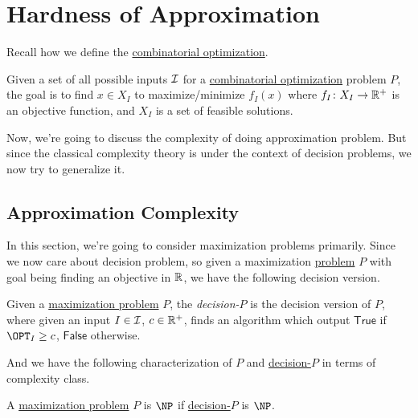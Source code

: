 \chapter{Hardness of Approximation}
Recall how we define the \hyperref[def:combinatorial-optimization]{combinatorial optimization}.

\begin{prev}
	Given a set of all possible inputs \(\mathcal{\MakeUppercase{i}} \) for a \hyperref[def:combinatorial-optimization]{combinatorial optimization} problem \(P\), the goal is to find \(x\in X_I\) to maximize/minimize \(f_I (x)\) where \(f_I \colon X_I \to \mathbb{\MakeUppercase{r}} ^+\) is an objective function, and \(X_I\) is a set of feasible solutions.
\end{prev}

Now, we're going to discuss the complexity of doing approximation problem. But since the classical complexity theory is under the context of decision problems, we now try to generalize it.

\section{Approximation Complexity}
In this section, we're going to consider maximization problems primarily. Since we now care about decision problem, so given a maximization \hyperref[def:combinatorial-optimization]{problem} \(P\) with goal being finding an objective in \(\mathbb{\MakeUppercase{r}} \), we have the following decision version.

\begin{definition}[Decision-\(P\)]\label{def:decision-P}
	Given a \hyperref[def:combinatorial-optimization]{maximization problem} \(P\), the \emph{decision-\(P\)} is the decision version of \(P\), where given an input \(I\in \mathcal{\MakeUppercase{i}} \), \(c\in \mathbb{\MakeUppercase{r}} ^+\), finds an algorithm which output \(\textsf{True}\) if \(\OPT_I \geq c\), \(\textsf{False}\) otherwise.
\end{definition}

And we have the following characterization of \(P\) and \hyperref[def:decision-P]{decision-\(P\)} in terms of complexity class.

\begin{definition}
	A \hyperref[def:combinatorial-optimization]{maximization problem} \(P\) is \(\NP\) if \hyperref[def:decision-P]{decision-\(P\)} is \(\NP\).
\end{definition}

